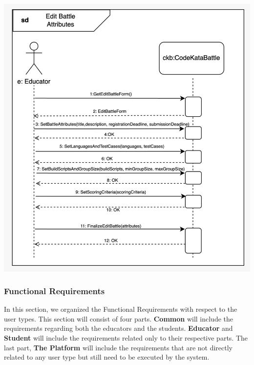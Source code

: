 \begin{enumerate}
\begin{center}
            \includegraphics[scale=0.2]{Images/sequence_diagrams/SD-edit_battle_attributes.jpeg}
    \end{center}

\end{enumerate}
\newpage
\subsubsection{Functional Requirements}

In this section, we organized the Functional Requirements with respect to the user types. This section will consist of four parts. \textbf{Common} will include the requirements regarding both the educators and the students. \textbf{Educator} and \textbf{Student} will include the requirements related only to their respective parts. The last part, \textbf{The Platform} will include the requirements that are not directly related to any user type but still need to be executed by the system.

